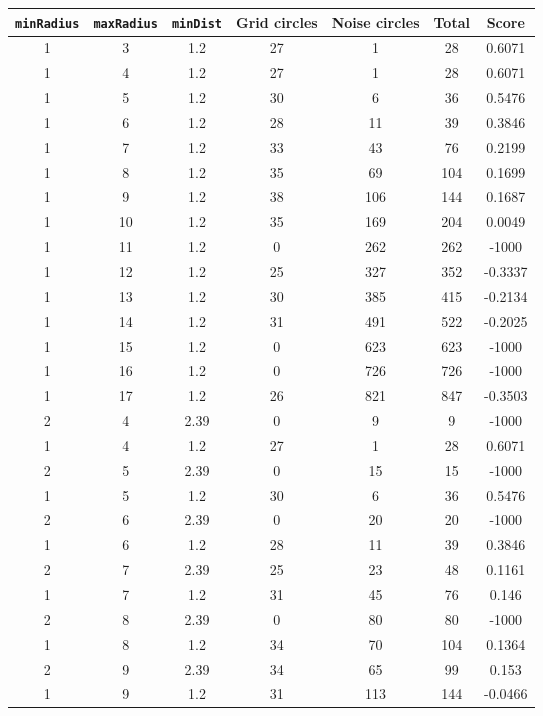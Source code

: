 \documentclass[letterpaper, 12pt]{article}
\begin{document}
\begin{longtable}{|c|c|c|c|c|c|c|}
\hline
\textbf{\texttt{minRadius}} & \textbf{\texttt{maxRadius}} & \textbf{\texttt{minDist}} & \textbf{Grid circles} & \textbf{Noise circles} & \textbf{Total} & \textbf{Score} \\
\hline
1 & 3 & 1.2 & 27 & 1 & 28 & 0.6071 \\
\hline
1 & 4 & 1.2 & 27 & 1 & 28 & 0.6071 \\
\hline
1 & 5 & 1.2 & 30 & 6 & 36 & 0.5476 \\
\hline
1 & 6 & 1.2 & 28 & 11 & 39 & 0.3846 \\
\hline
1 & 7 & 1.2 & 33 & 43 & 76 & 0.2199 \\
\hline
1 & 8 & 1.2 & 35 & 69 & 104 & 0.1699 \\
\hline
1 & 9 & 1.2 & 38 & 106 & 144 & 0.1687 \\
\hline
1 & 10 & 1.2 & 35 & 169 & 204 & 0.0049 \\
\hline
1 & 11 & 1.2 & 0 & 262 & 262 & -1000 \\
\hline
1 & 12 & 1.2 & 25 & 327 & 352 & -0.3337 \\
\hline
1 & 13 & 1.2 & 30 & 385 & 415 & -0.2134 \\
\hline
1 & 14 & 1.2 & 31 & 491 & 522 & -0.2025 \\
\hline
1 & 15 & 1.2 & 0 & 623 & 623 & -1000 \\
\hline
1 & 16 & 1.2 & 0 & 726 & 726 & -1000 \\
\hline
1 & 17 & 1.2 & 26 & 821 & 847 & -0.3503 \\
\hline
2 & 4 & 2.39 & 0 & 9 & 9 & -1000 \\
\hline
1 & 4 & 1.2 & 27 & 1 & 28 & 0.6071 \\
\hline
2 & 5 & 2.39 & 0 & 15 & 15 & -1000 \\
\hline
1 & 5 & 1.2 & 30 & 6 & 36 & 0.5476 \\
\hline
2 & 6 & 2.39 & 0 & 20 & 20 & -1000 \\
\hline
1 & 6 & 1.2 & 28 & 11 & 39 & 0.3846 \\
\hline
2 & 7 & 2.39 & 25 & 23 & 48 & 0.1161 \\
\hline
1 & 7 & 1.2 & 31 & 45 & 76 & 0.146 \\
\hline
2 & 8 & 2.39 & 0 & 80 & 80 & -1000 \\
\hline
1 & 8 & 1.2 & 34 & 70 & 104 & 0.1364 \\
\hline
2 & 9 & 2.39 & 34 & 65 & 99 & 0.153 \\
\hline
1 & 9 & 1.2 & 31 & 113 & 144 & -0.0466 \\

\end{longtable}
\end{document}
